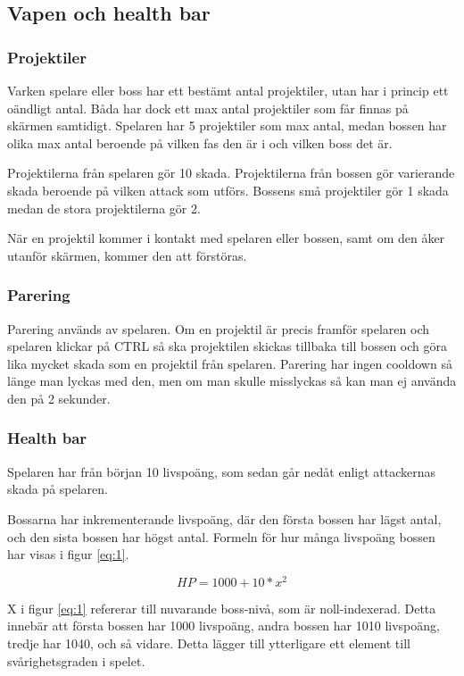 \documentclass{TDP005mall}
\begin{document}
\subsection{Vapen och health bar}
\subsubsection{Projektiler}
Varken spelare eller boss har ett bestämt antal projektiler, utan har i princip
ett oändligt antal. Båda har dock ett max antal projektiler som får finnas på skärmen samtidigt.
Spelaren har 5 projektiler som max antal, medan bossen har olika max antal beroende
på vilken fas den är i och vilken boss det är.

Projektilerna från spelaren gör 10 skada. Projektilerna från bossen gör varierande
skada beroende på vilken attack som utförs. Bossens små projektiler gör 1 skada
medan de stora projektilerna gör 2.

När en projektil kommer i kontakt med spelaren eller bossen, samt om den åker utanför
skärmen, kommer den att förstöras.

\subsubsection{Parering}
Parering används av spelaren. Om en projektil är precis framför spelaren och
spelaren klickar på CTRL så ska projektilen skickas tillbaka till bossen och göra
lika mycket skada som en projektil från spelaren. Parering har ingen cooldown
så länge man lyckas med den, men om man skulle misslyckas så kan man ej använda
den på 2 sekunder.

\subsubsection{Health bar}
Spelaren har från början 10 livspoäng, som sedan går nedåt enligt attackernas skada på spelaren.

Bossarna har inkrementerande livspoäng, där den första bossen har lägst antal, och
den sista bossen har högst antal. Formeln för hur många livspoäng bossen har visas i
figur \ref{eq:1}.

\begin{equation} \label{eq:1}
  HP = 1000 + 10 * x^2
\end{equation}

X i figur \ref{eq:1} refererar till nuvarande boss-nivå, som är noll-indexerad.
Detta innebär att första bossen har 1000 livspoäng, andra bossen har 1010 livspoäng,
tredje har 1040, och så vidare. Detta lägger till ytterligare ett element till
svårighetsgraden i spelet.
\end{document}

